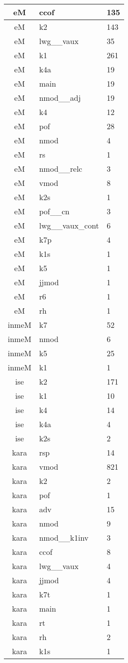 \documentclass[a4 paper]{article}
\begin{document}
\begin{longtable}{cp{}p{}}
eM & ccof & 135\\ \midrule eM & k2 & 143\\ \midrule eM & lwg\_\_vaux & 35\\ \midrule eM & k1 & 261\\ \midrule eM & k4a & 19\\ \midrule eM & main & 19\\ \midrule eM & nmod\_\_adj & 19\\ \midrule eM & k4 & 12\\ \midrule eM & pof & 28\\ \midrule eM & nmod & 4\\ \midrule eM & rs & 1\\ \midrule eM & nmod\_\_relc & 3\\ \midrule eM & vmod & 8\\ \midrule eM & k2s & 1\\ \midrule eM & pof\_\_cn & 3\\ \midrule eM & lwg\_\_vaux\_cont & 6\\ \midrule eM & k7p & 4\\ \midrule eM & k1s & 1\\ \midrule eM & k5 & 1\\ \midrule eM & jjmod & 1\\ \midrule eM & r6 & 1\\ \midrule eM & rh & 1\\ \midrule 
inmeM & k7 & 52\\ \midrule inmeM & nmod & 6\\ \midrule inmeM & k5 & 25\\ \midrule inmeM & k1 & 1\\ \midrule 
ise & k2 & 171\\ \midrule ise & k1 & 10\\ \midrule ise & k4 & 14\\ \midrule ise & k4a & 4\\ \midrule ise & k2s & 2\\ \midrule 
kara & rsp & 14\\ \midrule kara & vmod & 821\\ \midrule kara & k2 & 2\\ \midrule kara & pof & 1\\ \midrule kara & adv & 15\\ \midrule kara & nmod & 9\\ \midrule kara & nmod\_\_k1inv & 3\\ \midrule kara & ccof & 8\\ \midrule kara & lwg\_\_vaux & 4\\ \midrule kara & jjmod & 4\\ \midrule kara & k7t & 1\\ \midrule kara & main & 1\\ \midrule kara & rt & 1\\ \midrule kara & rh & 2\\ \midrule kara & k1s & 1\\ \midrule 

\end{longtable}
\end{document}
